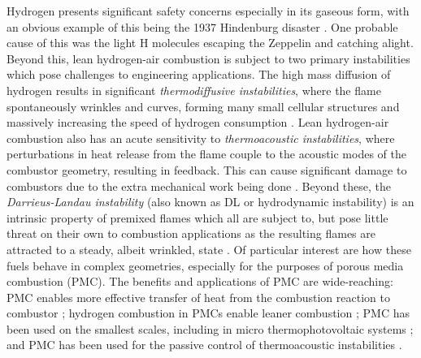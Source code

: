 Hydrogen presents significant safety concerns \cite{green2006HydrogenSafetyIssues} especially in its gaseous form, with an obvious example of this being the 1937 Hindenburg disaster \cite{dilisi2017HindenburgDisasterCombining}. One probable cause of this was the light H molecules escaping the Zeppelin and catching alight. Beyond this, lean hydrogen-air combustion is subject to two primary instabilities which pose challenges to engineering applications. The high mass diffusion of hydrogen results in significant \emph{thermodiffusive instabilities}, where the flame spontaneously wrinkles and curves, forming many small cellular structures \cite{sivashinsky1983InstabilitiesPatternFormation} and massively increasing the speed of hydrogen consumption \cite{howarth2023ThermodiffusivelyUnstableLeanPremixed}. Lean hydrogen-air combustion also has an acute sensitivity to \emph{thermoacoustic instabilities}, where perturbations in heat release from the flame couple to the acoustic modes of the combustor geometry, resulting in feedback. This can cause significant damage to combustors due to the extra mechanical work being done \cite{morgans2024ThermoacousticInstabilityCombustors}. Beyond these, the \emph{Darrieus-Landau instability} (also known as DL or hydrodynamic instability) is an intrinsic property of premixed flames which all are subject to, but pose little threat on their own to combustion applications as the resulting flames are attracted to a steady, albeit wrinkled, state \cite{matalon2018DarrieusLandauInstability}. Of particular interest are how these fuels behave in complex geometries, especially for the purposes of porous media combustion (PMC). The benefits and applications of PMC are wide-reaching: PMC enables more effective transfer of heat from the combustion reaction to combustor \cite{mujeebu2009CombustionPorousMedia}; hydrogen combustion in PMCs enable leaner combustion \cite{tseng2002EffectsHydrogenAddition}; PMC has been used on the smallest scales, including in micro thermophotovoltaic systems \cite{pan2015HydrogenOxygenPremixed}; and PMC has been used for the passive control of thermoacoustic instabilities \cite{meadows2015PorousInsertsPassive, dowd2018ThermoacousticInstabilityModel}.

